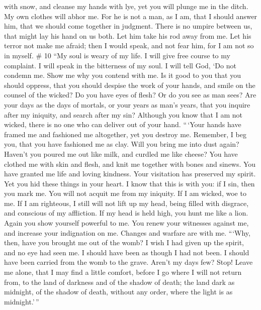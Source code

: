 with snow, and cleanse my hands with lye,  yet you will
plunge me in the ditch. My own clothes will abhor me.  For
he is not a man, as I am, that I should answer him, that we should come
together in judgment.  There is no umpire between us, that
might lay his hand on us both.  Let him take his rod away
from me. Let his terror not make me afraid;  then I would
speak, and not fear him, for I am not so in myself. \# 10 
``My soul is weary of my life. I will give free course to my complaint.
I will speak in the bitterness of my soul.  I will tell God,
`Do not condemn me. Show me why you contend with me.  Is it
good to you that you should oppress, that you should despise the work of
your hands, and smile on the counsel of the wicked?  Do you
have eyes of flesh? Or do you see as man sees?  Are your
days as the days of mortals, or your years as man's years, 
that you inquire after my iniquity, and search after my sin?
 Although you know that I am not wicked, there is no one who
can deliver out of your hand.  ``\,`Your hands have framed
me and fashioned me altogether, yet you destroy me. 
Remember, I beg you, that you have fashioned me as clay. Will you bring
me into dust again?  Haven't you poured me out like milk,
and curdled me like cheese?  You have clothed me with skin
and flesh, and knit me together with bones and sinews.  You
have granted me life and loving kindness. Your visitation has preserved
my spirit.  Yet you hid these things in your heart. I know
that this is with you:  if I sin, then you mark me. You
will not acquit me from my iniquity.  If I am wicked, woe
to me. If I am righteous, I still will not lift up my head, being filled
with disgrace, and conscious of my affliction.  If my head
is held high, you hunt me like a lion. Again you show yourself powerful
to me.  You renew your witnesses against me, and increase
your indignation on me. Changes and warfare are with me. 
```Why, then, have you brought me out of the womb? I wish I had given up
the spirit, and no eye had seen me.  I should have been as
though I had not been. I should have been carried from the womb to the
grave.  Aren't my days few? Stop! Leave me alone, that I
may find a little comfort,  before I go where I will not
return from, to the land of darkness and of the shadow of death;
 the land dark as midnight, of the shadow of death, without
any order, where the light is as midnight.'\,''

